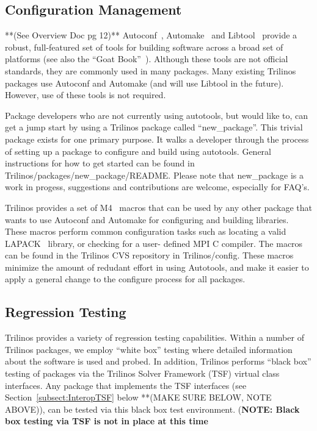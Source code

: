\documentclass[12pt,relax]{SANDreport}
\begin{document}
	\subsection{Configuration Management}
	**(See Overview Doc pg 12)**
Autoconf~\cite{Autoconf},  Automake~\cite{Automake} and
Libtool~\cite{Libtool} provide a robust, full-featured set of tools for
building software across a broad set of platforms (see also the ``Goat
Book''~\cite{GoatBook}).  Although these
tools are not official standards, they are commonly used in many
packages.  Many existing
Trilinos packages use Autoconf and Automake (and will use
Libtool in the future).  However, use of these tools is not required.

Package developers who are not currently using autotools, but would like
to, can get a jump start by using a Trilinos package called 
``new\_package''.  This trivial package exists for one primary purpose.  
It walks a developer through the process of setting up a package to 
configure and build using autotools.  General instructions for how to get 
started can be found in Trilinos/packages/new\_package/README.  Please note 
that new\_package is a work in progess, suggestions and contributions are 
welcome, especially for FAQ's.

Trilinos provides a set of M4~\cite{M4} macros that can be used by any other
package that wants to use Autoconf and Automake for configuring and
building libraries.  These macros perform common configuration tasks such as
locating a valid LAPACK~\cite{lapack} library, or checking for a user-
defined MPI C compiler.  The macros can be found in the Trilinos CVS 
repository in Trilinos/config.  These macros minimize the amount of redudant
 effort in using Autotools, and make it easier to apply a general change to 
the configure process for all packages.
	\subsection{Regression Testing}
Trilinos provides a variety of regression
testing capabilities.  Within a number of Trilinos packages, we employ
``white box'' testing where detailed information about the software is
used and probed.  In addition, Trilinos performs ``black box'' testing
of packages via the Trilinos Solver Framework (TSF) virtual class
interfaces.  Any package that implements the TSF interfaces (see
Section~\ref{subsect:InteropTSF} below **(MAKE SURE BELOW, NOTE ABOVE)), can be tested via this black box
test environment.  ({\bf NOTE: Black box testing via TSF is not in
place at this time}
\end{document}
